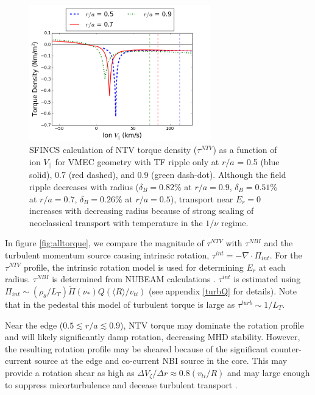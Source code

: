 \documentclass{article}
\numberwithin{figure}{section}
\numberwithin{equation}{section}
\begin{document}
\begin{figure}[h!]
\centering
\includegraphics[width=0.7\textwidth]
{Torque_radiusscaling.png}
\caption{\label{fig:Torque_radiusscaling} SFINCS calculation of NTV torque density ($\tau^{NTV}$) as a function of ion $V_{||}$ for VMEC geometry with TF ripple only at $r/a$ = 0.5 (blue solid), 0.7 (red dashed), and 0.9 (green dash-dot). Although the field ripple decreases with radius ($\delta_B = 0.82\%$ at $r/a = 0.9$, $\delta_B = 0.51\%$ at $r/a = 0.7$, $\delta_B = 0.26\%$ at $r/a = 0.5$), transport near $E_r = 0$ increases with decreasing radius because of strong scaling of neoclassical transport with temperature in the $1/\nu$ regime.}
\end{figure}

In figure \ref{fig:alltorque}, we compare the magnitude of $\tau^{NTV}$ with $\tau^{NBI}$ and the turbulent momentum source causing intrinsic rotation, $\tau^{int} = -\nabla \cdot \Pi_{int}$. For the $\tau^{NTV}$ profile, the intrinsic rotation model is used for determining $E_r$ at each radius. $\tau^{NBI}$ is determined from NUBEAM calculations \cite{Poli2014}. $\tau^{int}$ is estimated using $\Pi_{int} \sim (\rho_{\theta}/L_T) \widetilde{\Pi}(\nu_*) Q (\langle R \rangle/v_{ti})$ (see appendix \ref{turbQ} for details). Note that in the pedestal this model of turbulent torque is large as $\tau^{turb} \sim 1/L_T$. 

Near the edge ($0.5 \lesssim r/a \lesssim 0.9$), NTV torque may dominate the rotation profile and will likely significantly damp rotation, decreasing MHD stability. However, the resulting rotation profile may be sheared because of the significant counter-current source at the edge and co-current NBI source in the core. This may provide a rotation shear as high as $\Delta V_{\zeta}/ \Delta r \approx 0.8 (v_{ti}/R)$ and may large enough to suppress micorturbulence and decease turbulent transport \cite{Hahm1994}. 
\end{document}
